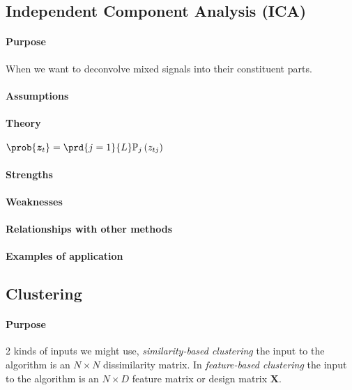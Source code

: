 \subsection{Independent Component Analysis (ICA)}
\paragraph{Purpose}
When we want to deconvolve mixed signals into their constituent parts.\\

\paragraph{Assumptions}
\paragraph{Theory}
$\prob{\bm{z}_{t}} = \prd{j=1}{L}\mathbb{P}_{j}\left(z_{tj}\right)$
\paragraph{Strengths}
\paragraph{Weaknesses}
\paragraph{Relationships with other methods}
\paragraph{Examples of application}


\subsection{Clustering}

\paragraph{Purpose}
2 kinds of inputs we might use, \emph{similarity-based clustering} the input to the algorithm is an
$N\times N$ dissimilarity matrix. In \emph{feature-based clustering} the input to the algorithm
is an $N\times D$ feature matrix or design matrix $\bm{X}$.



